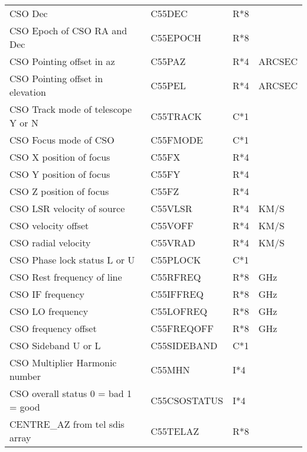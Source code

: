 \begin{tabular}{||l|l|l|l||}
CSO Dec                                            & C55DEC    & R*8    &  ~    \\      
CSO Epoch of CSO RA and Dec                        & C55EPOCH  & R*8    &  ~    \\      
CSO Pointing offset in az                          & C55PAZ    & R*4    &ARCSEC \\      
CSO Pointing offset in elevation                   & C55PEL    & R*4    &ARCSEC \\      
CSO Track mode of telescope Y or N                 & C55TRACK  & C*1    &  ~    \\      
CSO Focus mode of CSO                              & C55FMODE  & C*1    &  ~    \\      
CSO X position of focus                            & C55FX     & R*4    &  ~    \\      
CSO Y position of focus                            & C55FY     & R*4    &  ~    \\      
CSO Z position of focus                            & C55FZ     & R*4    &  ~    \\      
CSO LSR velocity of source                         & C55VLSR   & R*4    & KM/S  \\      
CSO  velocity offset                               & C55VOFF   & R*4    & KM/S  \\      
CSO radial velocity                                & C55VRAD   & R*4    & KM/S  \\      
CSO Phase lock status L or U                       & C55PLOCK  & C*1    &  ~    \\      
CSO Rest frequency of line                         & C55RFREQ  & R*8    & GHz   \\      
CSO IF frequency                                   & C55IFFREQ   & R*8    & GHz   \\      
CSO LO frequency                                   & C55LOFREQ   & R*8    & GHz   \\      
CSO frequency offset                               & C55FREQOFF  & R*8    & GHz   \\      
CSO Sideband U or L                                & C55SIDEBAND & C*1    &  ~    \\      
CSO Multiplier Harmonic number                     & C55MHN      & I*4    &  ~    \\      
CSO overall status 0 = bad  1 = good               & C55CSOSTATUS& I*4    &  ~    \\      
CENTRE\_AZ from tel sdis array                     & C55TELAZ    & R*8    &  ~    \\      

\end{tabular}
